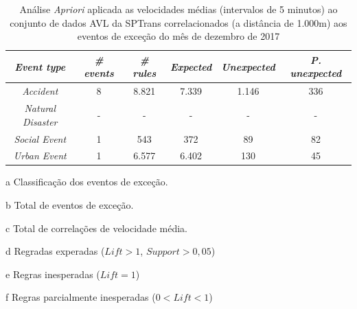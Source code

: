 \documentclass[
	12pt,				%
	oneside,			%
	a4paper,			%
	english,			%
	brazil				%
	]{abntex2ppgsi}
\begin{document}
{{\begin{apendicesenv}
\begin{table}[!htb]
\centering
\begin{threeparttable}
\caption {Análise \textit{Apriori} aplicada as velocidades médias (intervalos de 5 minutos) ao conjunto de dados AVL da SPTrans correlacionados (a distância de 1.000m) aos eventos de exceção do mês de dezembro de 2017}
\label {tab:aprioriFull}
\begin{tabular}{c|c|c|c|c|c}
\hline
\textbf{\textit{Event type}}\tnote{a} & \textbf{\textit{\# events}}\tnote{b} & \textit{\textbf{\# rules}}\tnote{c} & \textbf{\textit{Expected}}\tnote{d} & \textbf{\textit{Unexpected}}\tnote{e} & \textbf{\textit{P. unexpected}}\tnote{f}   \\
\hline
\textit{Accident} & 8 & 8.821 & 7.339 & 1.146 & 336 \\
\textit{Natural Disaster} & - & - & - & - & - \\
\textit{Social Event} & 1 & 543 & 372 & 89 & 82 \\
\textit{Urban Event} & 1 & 6.577 & 6.402 & 130 & 45 \\
\hline
\end{tabular}
\begin{tablenotes}
            \item[a] Classificação dos eventos de exceção.
            \item[b] Total de eventos de exceção.
            \item[c] Total de correlações de velocidade média.
            \item[d] Regradas experadas ($Lift > 1$, $Support > 0,05$)
            \item[e] Regras inesperadas ($Lift = 1$)
            \item[f] Regras parcialmente inesperadas ($0 < Lift < 1$)
        \end{tablenotes}
\end{threeparttable}
\end{table}


\end{apendicesenv}}}
\end{document}
